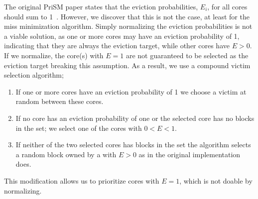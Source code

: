 The original PriSM paper states that the eviction probabilities, $E_i$, for all cores should sum to 1~\cite{Manikantan2012}.
However, we discover that this is not the case, at least for the miss minimization algorithm.
Simply normalizing the eviction probabilities is not a viable solution, as one or more cores may have an eviction probability of 1, indicating that they are always the eviction target, while other cores have $E > 0$.
If we normalize, the core(s) with $E=1$ are not guaranteed to be selected as the eviction target breaking this assumption.
As a result, we use a compound victim selection algorithm;
\begin{enumerate}
\item If one or more cores have an eviction probability of 1 we choose a victim at random between these cores.
\item If no core has an eviction probability of one or the selected core has no blocks in the set; we select one of the cores with $0 < E < 1$.
\item If neither of the two selected cores has blocks in the set the algorithm selects a random block owned by a with $E > 0$ as in the original implementation does.
\end{enumerate}
This modification allows us to prioritize cores with $E = 1$, which is not doable by normalizing.